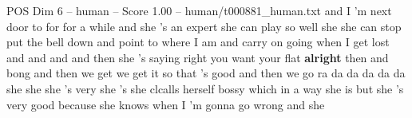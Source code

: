 \begin{textsample}{POS Dim 6 – human – Score 1.00 – human/t000881\_human.txt}  \label{ex:f6_pos_018}
and I 'm next door to for for a while and she 's an expert she can play so well she she can stop put the bell down and point to where I am and carry on going when I get lost and and and and then she 's saying right you want your flat \textbf{alright} then and bong and then we get we get it so that 's good and then we go ra da da da da da she she she 's very she 's she clcalls herself bossy which in a way she is but she 's very good because she knows when I 'm gonna go wrong and she

\end{textsample}
